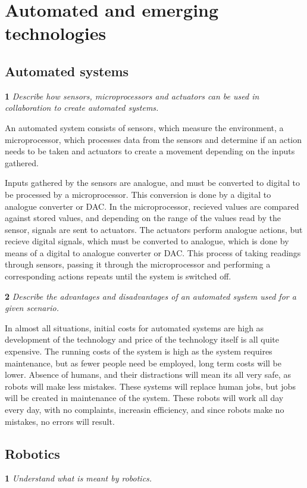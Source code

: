 \section{Automated and emerging technologies}
\subsection{Automated systems}

\textbf{1} \textit{Describe how sensors, microprocessors and
actuators can be used in collaboration to create
automated systems.}

An automated system consists of sensors, which measure the environment, a microprocessor, which
processes data from the sensors and determine if an action needs to be taken and actuators
to create a movement depending on the inputs gathered. 

Inputs gathered by the sensors are analogue, and must be converted to digital to be processed by
a microprocessor. This conversion is done by a digital to analogue converter or DAC. In the 
microprocessor, recieved values are compared against stored values, and depending on the range
of the values read by the sensor, signals are sent to actuators. The actuators perform analogue
actions, but recieve digital signals, which must be converted to analogue, which is done by means
of a digital to analogue converter or DAC. This process of taking readings through sensors,
passing it through the microprocessor and performing a corresponding actions repeats until the
system is switched off.

\bigskip

\noindent\textbf{2} \textit{Describe the advantages and disadvantages of an
automated system used for a given scenario.}

In almost all situations, initial costs for automated systems are high as development of the
technology and price of the technology itself is all quite expensive. The running costs of the
system is high as the system requires maintenance, but as fewer people need be employed, long
term costs will be lower. Absence of humans, and their distractions will mean its all very
safe, as robots will make less mistakes. These systems will replace human jobs, but jobs will
be created in maintenance of the system. These robots will work all day every day, with no 
complaints, increasin efficiency, and since robots make no mistakes, no errors will result.

\subsection{Robotics}
\noindent\textbf{1} \textit{Understand what is meant by robotics.}

